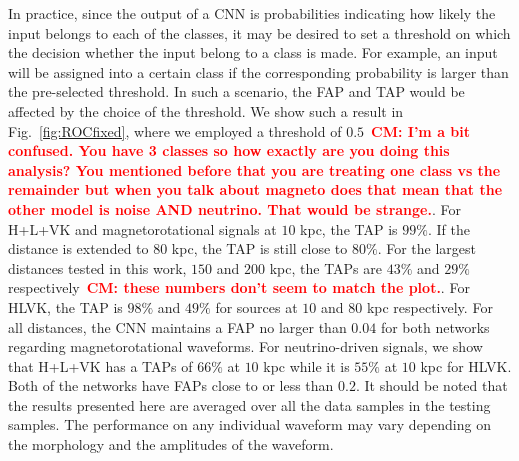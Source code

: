 \documentclass[aps,twocolumn,showpacs,groupedaddress, nofootinbib]{revtex4}  %
\newcommand{\cm}[1]{\textbf{\textcolor{red}{CM: #1}}}
\begin{document}
In practice, since the output of a \ac{CNN} is probabilities indicating how
likely the input belongs to each of the classes, it may be desired to set a
threshold on which the decision whether the input belong to a class is made.
For example, an input will be assigned into a certain class if the
corresponding probability is larger than the pre-selected threshold. In such a
scenario, the \ac{FAP} and \ac{TAP} would be affected by the choice of the
threshold. We show such a result in Fig.~\ref{fig:ROCfixed}, where we employed
a threshold of $0.5$~\cm{I'm a bit confused. You have 3 classes so how exactly
are you doing this analysis? You mentioned before that you are treating one
class vs the remainder but when you talk about magneto does that mean that the
other model is noise AND neutrino. That would be strange.}. For H+L+VK and
magnetorotational signals at $10$ kpc, the \ac{TAP} is $99\%$. If the distance
is extended to $80$ kpc, the \ac{TAP} is still close to $80\%$.  For the
largest distances tested in this work, $150$ and $200$ kpc, the \acp{TAP} are
$43\%$ and $29\%$ respectively~\cm{these numbers don't seem to match the
plot.}. For HLVK, the \ac{TAP} is $98\%$ and $49\%$ for sources at $10$ and
$80$ kpc respectively.
For all distances, the \ac{CNN} maintains a \ac{FAP} no larger than $0.04$ for
both networks regarding magnetorotational waveforms. For neutrino-driven
signals, we show that H+L+VK has a \acp{TAP} of $66\%$ at $10$ kpc while it
is $55\%$ at $10$ kpc for HLVK.  Both of the networks have \acp{FAP} close to
or less than $0.2$. It should be noted that the results presented here are
averaged over all the data samples in the testing samples. The performance on
any individual waveform may vary depending on the morphology and the amplitudes
of the waveform.


\end{document}
